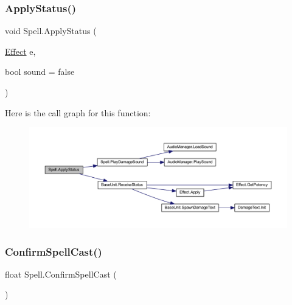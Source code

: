 \subsubsection{\texorpdfstring{ApplyStatus()}{ApplyStatus()}}
{\footnotesize\ttfamily void Spell.\+Apply\+Status (\begin{DoxyParamCaption}\item[{\mbox{\hyperlink{class_effect}{Effect}}}]{e,  }\item[{bool}]{sound = {\ttfamily false} }\end{DoxyParamCaption})}

Here is the call graph for this function\+:\nopagebreak
\begin{figure}[H]
\begin{center}
\leavevmode
\includegraphics[width=350pt]{class_spell_aa020942716a6504fc6b23351a4baa3b6_cgraph}
\end{center}
\end{figure}
\mbox{\label{class_spell_a89146285dc4dadf46398da2683bcc869}} 
\subsubsection{\texorpdfstring{ConfirmSpellCast()}{ConfirmSpellCast()}}
{\footnotesize\ttfamily float Spell.\+Confirm\+Spell\+Cast (\begin{DoxyParamCaption}{ }\end{DoxyParamCaption})}

